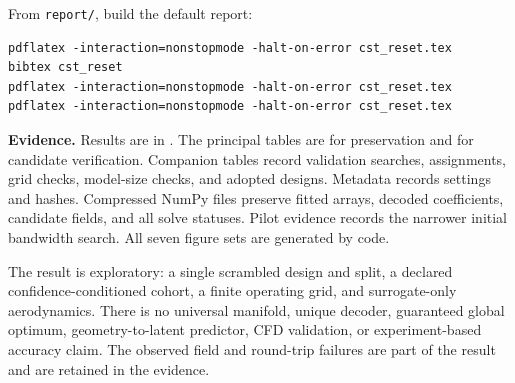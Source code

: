 \documentclass[10pt,a4paper]{article}
\begin{document}
From \texttt{report/}, build the default report:
\begin{verbatim}
pdflatex -interaction=nonstopmode -halt-on-error cst_reset.tex
bibtex cst_reset
pdflatex -interaction=nonstopmode -halt-on-error cst_reset.tex
pdflatex -interaction=nonstopmode -halt-on-error cst_reset.tex
\end{verbatim}

\textbf{Evidence.} Results are in .
The principal tables are  for preservation and
 for candidate verification. Companion tables record
validation searches, assignments, grid checks, model-size checks, and adopted
designs. Metadata records settings and hashes. Compressed NumPy files preserve
fitted arrays, decoded coefficients, candidate fields, and all solve statuses.
Pilot evidence records the narrower initial bandwidth search. All seven figure
sets are generated by code.

The result is exploratory: a single scrambled design and split, a declared
confidence-conditioned cohort, a finite operating grid, and surrogate-only
aerodynamics. There is no universal manifold, unique decoder, guaranteed
global optimum, geometry-to-latent predictor, CFD validation, or experiment-based
accuracy claim. The observed field and round-trip failures are part of the
result and are retained in the evidence.

\small


\end{document}
